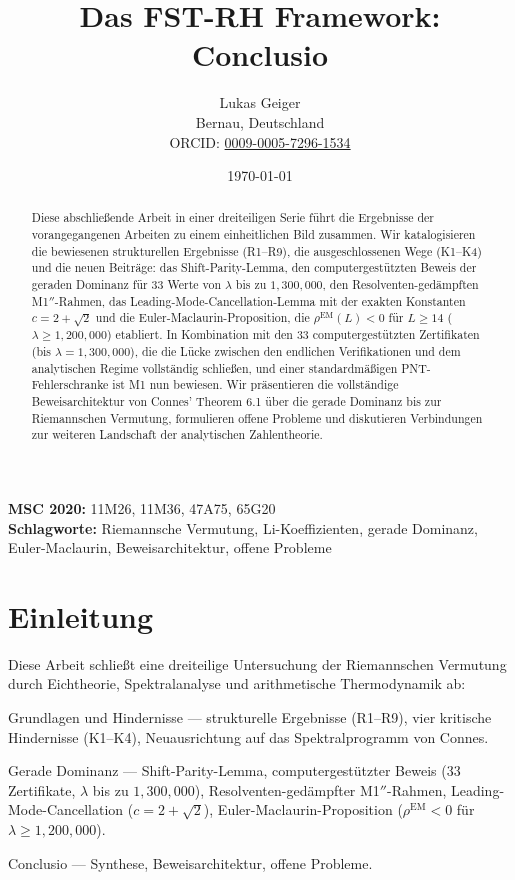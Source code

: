 \documentclass[12pt,a4paper]{article}
\title{Das FST-RH Framework: Conclusio}
\author{Lukas Geiger\\
\small Bernau, Deutschland\\
\small ORCID: \href{https://orcid.org/0009-0005-7296-1534}{0009-0005-7296-1534}}
\date{\today}
\theoremstyle{definition}
\theoremstyle{remark}
\begin{document}
\maketitle

\begin{abstract}
Diese abschließende Arbeit in einer dreiteiligen Serie führt die Ergebnisse der vorangegangenen Arbeiten zu einem einheitlichen Bild zusammen. Wir katalogisieren die bewiesenen strukturellen Ergebnisse (R1--R9), die ausgeschlossenen Wege (K1--K4) und die neuen Beiträge: das Shift-Parity-Lemma, den computergestützten Beweis der geraden Dominanz für 33 Werte von $\lambda$ bis zu $1{,}300{,}000$, den Resolventen-gedämpften M1$''$-Rahmen, das Leading-Mode-Cancellation-Lemma mit der exakten Konstanten $c = 2 + \sqrt{2}$ und die Euler-Maclaurin-Proposition, die $\rho^{\mathrm{EM}}(L) < 0$ für $L \geq 14$ ($\lambda \geq 1{,}200{,}000$) etabliert. In Kombination mit den $33$ computergestützten Zertifikaten (bis $\lambda = 1{,}300{,}000$), die die Lücke zwischen den endlichen Verifikationen und dem analytischen Regime vollständig schließen, und einer standardmäßigen PNT-Fehlerschranke ist M1 nun bewiesen. Wir präsentieren die vollständige Beweisarchitektur von Connes' Theorem 6.1 über die gerade Dominanz bis zur Riemannschen Vermutung, formulieren offene Probleme und diskutieren Verbindungen zur weiteren Landschaft der analytischen Zahlentheorie.
\end{abstract}

\noindent\textbf{MSC 2020:} 11M26, 11M36, 47A75, 65G20\\
\textbf{Schlagworte:} Riemannsche Vermutung, Li-Koeffizienten, gerade Dominanz, Euler-Maclaurin, Beweisarchitektur, offene Probleme

\tableofcontents


\section{Einleitung}
\label{sec:intro}

Diese Arbeit schließt eine dreiteilige Untersuchung der Riemannschen Vermutung durch Eichtheorie, Spektralanalyse und arithmetische Thermodynamik ab:
\begin{description}[font=\bfseries,leftmargin=2em]
  \item[Teil~I \cite{Geiger2026partI}:] Grundlagen und Hindernisse --- strukturelle Ergebnisse (R1--R9), vier kritische Hindernisse (K1--K4), Neuausrichtung auf das Spektralprogramm von Connes.
  \item[Teil~II \cite{Geiger2026partII}:] Gerade Dominanz --- Shift-Parity-Lemma, computergestützter Beweis ($33$ Zertifikate, $\lambda$ bis zu $1{,}300{,}000$), Resolventen-gedämpfter M1$''$-Rahmen, Leading-Mode-Cancellation ($c = 2 + \sqrt{2}$), Euler-Maclaurin-Proposition ($\rho^{\mathrm{EM}} < 0$ für $\lambda \geq 1{,}200{,}000$).
  \item[Teil~III (diese Arbeit):] Conclusio --- Synthese, Beweisarchitektur, offene Probleme.
\end{description}
\end{document}
